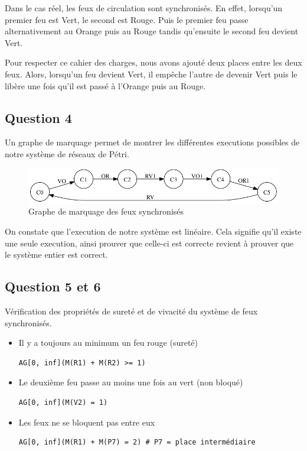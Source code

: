 \documentclass[pdftex,12pt,a4paper]{article}
\begin{document}
Dans le cas réel, les feux de circulation sont synchronisés. En effet, lorsqu'un premier feu est Vert, le second est Rouge. Puis le premier feu passe alternativement au Orange puis au Rouge tandis qu'ensuite le second feu devient Vert.

Pour respecter ce cahier des charges, nous avons ajouté deux places entre les deux feux. Alors, lorsqu'un feu devient Vert, il empêche l'autre de devenir Vert puis le libère une fois qu'il est passé à l'Orange puis au Rouge.

\subsection{Question 4}

Un graphe de marquage permet de montrer les différentes executions possibles de notre système de réseaux de Pétri.

\begin{figure}[H]
  \centering
  \includegraphics[scale=0.5]{ressources/part1/traitement-question4/graphe.png}
  \caption{Graphe de marquage des feux synchronisés}
\end{figure}

On constate que l'execution de notre système est linéaire. Cela signifie qu'il existe une seule execution, ainsi prouver que celle-ci est correcte revient à prouver que le système entier est correct.

\subsection{Question 5 et 6}

Vérification des propriétés de sureté et de vivacité du système de feux synchronisés.

\begin{itemize}
	\item Il y a toujours au minimum un feu rouge (sureté)
\begin{verbatim}
AG[0, inf](M(R1) + M(R2) >= 1)
\end{verbatim}

	\item Le deuxième feu passe au moins une fois au vert (non bloqué)
\begin{verbatim}
AG[0, inf](M(V2) = 1)
\end{verbatim}

	\item Les feux ne se bloquent pas entre eux
\begin{verbatim}
AG[0, inf](M(R1) + M(P7) = 2) # P7 = place intermédiaire
\end{verbatim}
\end{itemize}
\end{document}
